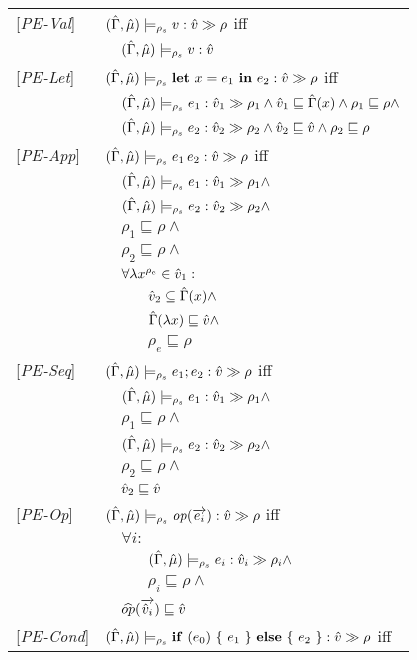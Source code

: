 \begin{tabular}{l l l l}
{[\textit{PE-Val}]}&\multicolumn{3}{l}{$\caest {v}$ iff}\\
&&\multicolumn{2}{l}{$\aenvs \modelrho v : \vat$} \\
{[\textit{PE-Let}]}&\multicolumn{3}{l}{$\caest {\letexpr{x}{e_1}{e_2}}$ iff}\\
&&\multicolumn{2}{l}{$\caesti {e_1} {1} \wedge \vat_1 \sqsubseteq \Env(x) \wedge \rho_1 \sqsubseteq \rho \wedge$} \\
&&\multicolumn{2}{l}{$\aenvs \modelrho e_2 : \vat_2 \gg \rho_2 \wedge \vat_2 \sqsubseteq \vat \wedge \rho_2 \sqsubseteq \rho$} \\
{[\textit{PE-App}]}&\multicolumn{3}{l}{$\caest {\appl {e_1} {e_2}}$ iff} \\
&&\multicolumn{2}{l}{$\caesti {e_1} {1} \wedge$} \\
&&\multicolumn{2}{l}{$\caesti {e_2} {2} \wedge$} \\
&&\multicolumn{2}{l}{$\rho_1 \sqsubseteq \rho \wedge$} \\
&&\multicolumn{2}{l}{$\rho_2 \sqsubseteq \rho \wedge$} \\
&&\multicolumn{2}{l}{$\forall \lambda x^{\rho_e} \in \vat_1 :$}\\
&&&$\vat_2 \subseteq \Env(x) \wedge$\\
&&&$\Env(\lambda x) \sqsubseteq \vat \wedge$\\ 
&&&$\rho_e \sqsubseteq \rho$\\
{[\textit{PE-Seq}]}&\multicolumn{3}{l}{$\caest {e_1; e_2} $ iff}\\
&&\multicolumn{2}{l}{$ \caesti {e_1} {1} \wedge $}\\
&&\multicolumn{2}{l}{$\rho_1 \sqsubseteq \rho \wedge$} \\
&&\multicolumn{2}{l}{$ \caesti {e_2} {2} \wedge $} \\
&&\multicolumn{2}{l}{$\rho_2 \sqsubseteq \rho \wedge$} \\
&&\multicolumn{2}{l}{$\vat_2 \sqsubseteq \vat$} \\
{[\textit{PE-Op}]}&\multicolumn{3}{l}{$\caest {\op (\vec{e_i})} $ iff}\\
&&\multicolumn{2}{l}{$\forall i :$}\\
&&&$\caesti {e_i} {i} \wedge $\\
&&&$\rho_i \sqsubseteq \rho \wedge$\\
&&\multicolumn{2}{l}{$\widehat{op} (\vec{\vat_i}) \sqsubseteq \vat $}\\
{[\textit{PE-Cond}]}&\multicolumn{3}{l}{$\caest {\cond {e_0} {e_1} {e_2}} $ iff}\\

\end{tabular}
